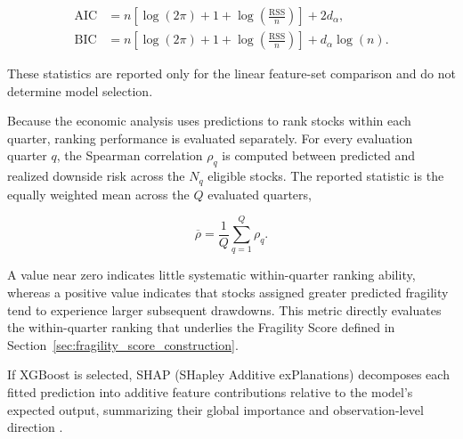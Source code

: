 \begin{equation}
    \begin{aligned}
        \mathrm{AIC}
         & =
        n\left[
            \log(2\pi)+1+
            \log\left(\frac{\mathrm{RSS}}{n}\right)
            \right]
        +2d_{\alpha}, \\
        \mathrm{BIC}
         & =
        n\left[
            \log(2\pi)+1+
            \log\left(\frac{\mathrm{RSS}}{n}\right)
            \right]
        +d_{\alpha}\log(n).
    \end{aligned}
    \label{eq:ridge_information_criteria}
\end{equation}

\noindent
These statistics are reported only for the linear feature-set comparison and do not determine model selection.

Because the economic analysis uses predictions to rank stocks within each quarter, ranking performance is evaluated separately. For every evaluation quarter \(q\), the Spearman correlation \(\rho_q\) is computed between predicted and realized downside risk across the \(N_q\) eligible stocks. The reported statistic is the equally weighted mean across the \(Q\) evaluated quarters,

\begin{equation}
    \overline{\rho}
    =
    \frac{1}{Q}
    \sum_{q=1}^{Q}
    \rho_q.
    \label{eq:mean_quarterly_spearman}
\end{equation}

\noindent
A value near zero indicates little systematic within-quarter ranking ability, whereas a positive value indicates that stocks assigned greater predicted fragility tend to experience larger subsequent drawdowns. This metric directly evaluates the within-quarter ranking that underlies the Fragility Score defined in Section~\ref{sec:fragility_score_construction}.

If XGBoost is selected, SHAP (SHapley Additive exPlanations) decomposes each fitted prediction into additive feature contributions relative to the model's expected output, summarizing their global importance and observation-level direction \parencite{lundberg2017unified}.
